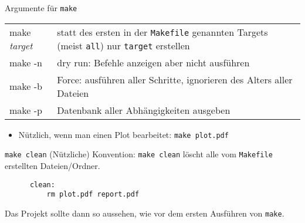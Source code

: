 \begin{frame}[fragile]{Argumente für \texttt{make}}
  \begin{tabu}{>{\ttfamily}l X[,L]}
    make \textit{target} & statt des ersten in der \texttt{Makefile} genannten Targets (meist \texttt{all}) nur \texttt{target} erstellen \\
    make -n              & dry run: Befehle anzeigen aber nicht ausführen \\
    make -b              & Force: ausführen aller Schritte, ignorieren des Alters aller Dateien \\
    make -p              & Datenbank aller Abhängigkeiten ausgeben
  \end{tabu}
  \begin{itemize}
    \item Nützlich, wenn man einen Plot bearbeitet: \texttt{make plot.pdf}
  \end{itemize}
\end{frame}

\begin{frame}[fragile]{\texttt{make clean}}
  (Nützliche) Konvention: \texttt{make clean} löscht alle vom \texttt{Makefile} erstellten Dateien/Ordner.

  \begin{center}
    \begin{verbatim}
      clean:
          rm plot.pdf report.pdf
    \end{verbatim}
  \end{center}

  Das Projekt sollte dann so aussehen, wie vor dem ersten Ausführen von \texttt{make}.
\end{frame}

